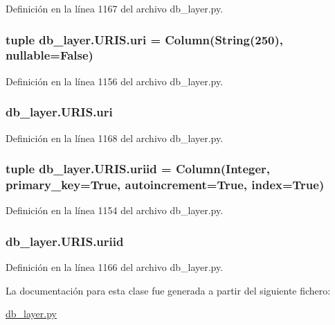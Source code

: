 Definición en la línea 1167 del archivo db\-\_\-layer.\-py.

\hypertarget{classdb__layer_1_1_u_r_i_s_adb880c6700b90a1413c072e1897fb5ba}{
\subsubsection[{uri}]{\setlength{\rightskip}{0pt plus 5cm}tuple db\-\_\-layer.\-U\-R\-I\-S.\-uri = Column(String(250), nullable=False)\hspace{0.3cm}{\ttfamily [static]}}}\label{classdb__layer_1_1_u_r_i_s_adb880c6700b90a1413c072e1897fb5ba}


Definición en la línea 1156 del archivo db\-\_\-layer.\-py.

\hypertarget{classdb__layer_1_1_u_r_i_s_a96adfe69ce986533f348b9534bd56ba1}{
\subsubsection[{uri}]{\setlength{\rightskip}{0pt plus 5cm}db\-\_\-layer.\-U\-R\-I\-S.\-uri}}\label{classdb__layer_1_1_u_r_i_s_a96adfe69ce986533f348b9534bd56ba1}


Definición en la línea 1168 del archivo db\-\_\-layer.\-py.

\hypertarget{classdb__layer_1_1_u_r_i_s_a6120a757a93cee58b3edbd0a21c53ea1}{
\subsubsection[{uriid}]{\setlength{\rightskip}{0pt plus 5cm}tuple db\-\_\-layer.\-U\-R\-I\-S.\-uriid = Column(Integer, primary\-\_\-key=True, autoincrement=True, index=True)\hspace{0.3cm}{\ttfamily [static]}}}\label{classdb__layer_1_1_u_r_i_s_a6120a757a93cee58b3edbd0a21c53ea1}


Definición en la línea 1154 del archivo db\-\_\-layer.\-py.

\hypertarget{classdb__layer_1_1_u_r_i_s_a28e0597e0d662150c83be1617ed84fb1}{
\subsubsection[{uriid}]{\setlength{\rightskip}{0pt plus 5cm}db\-\_\-layer.\-U\-R\-I\-S.\-uriid}}\label{classdb__layer_1_1_u_r_i_s_a28e0597e0d662150c83be1617ed84fb1}


Definición en la línea 1166 del archivo db\-\_\-layer.\-py.



La documentación para esta clase fue generada a partir del siguiente fichero\-:\begin{DoxyCompactItemize}
\item 
\hyperlink{db__layer_8py}{db\-\_\-layer.\-py}\end{DoxyCompactItemize}
